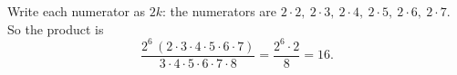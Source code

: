 Write each numerator as $2k$: the numerators are $2\cdot2,\ 2\cdot3,\ 2\cdot4,\ 2\cdot5,\ 2\cdot6,\ 2\cdot7$. So the product is
\[
\dfrac{2^6\,(2\cdot3\cdot4\cdot5\cdot6\cdot7)}{3\cdot4\cdot5\cdot6\cdot7\cdot8}=\dfrac{2^6\cdot2}{8}=\boxed{16}.
\]
